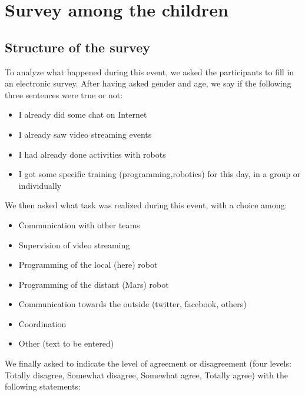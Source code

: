 \documentclass{intech-journal}
\begin{document}
\section{Survey among the children}

\subsection{Structure of the survey}

To analyze what happened during this event, we asked the participants to fill in an electronic survey.
After having asked gender and age, we say if the following three sentences were true or not:
\begin{itemize}
\item I already did some chat on Internet 	
\item I already saw video streaming events 	
\item I had already done activities with robots 
\item I got some specific training (programming,robotics) for this day, in a group or individually
\end{itemize}
We then asked what task was realized during this event, with a choice among:
\begin{itemize}
\item Communication with other teams
\item Supervision of video streaming
\item Programming of the local (here) robot
\item Programming of the distant (Mars) robot
\item Communication towards the outside (twitter, facebook, others)
\item Coordination
\item Other (text to be entered)
\end{itemize}
We finally asked to indicate the level of agreement or disagreement (four levels: Totally disagree, Somewhat disagree, Somewhat agree, Totally agree) with the following statements:
\end{document}
